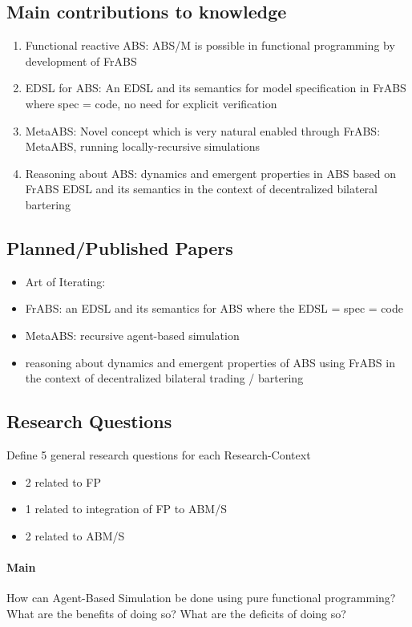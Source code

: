 \subsection{Main contributions to knowledge}
\begin{enumerate}
	\item Functional reactive ABS: ABS/M is possible in functional programming by development of FrABS
	\item EDSL for ABS: An EDSL and its semantics for model specification in FrABS where spec = code, no need for explicit verification
	\item MetaABS: Novel concept which is very natural enabled through FrABS: MetaABS, running locally-recursive simulations
	\item Reasoning about ABS: dynamics and emergent properties in ABS based on FrABS EDSL and its semantics in the context of decentralized bilateral bartering
\end{enumerate}


\subsection{Planned/Published Papers}
\begin{itemize}
	\item Art of Iterating: 
	\item FrABS: an EDSL and its semantics for ABS where the EDSL = spec = code
	\item MetaABS: recursive agent-based simulation
	\item reasoning about dynamics and emergent properties of ABS using FrABS in the context of decentralized bilateral trading / bartering
\end{itemize}


\subsection{Research Questions}
Define 5 general research questions for each Research-Context
	\begin{itemize}
    \item 2 related to FP
    \item 1 related to integration of FP to ABM/S
    \item 2 related to ABM/S
    \end{itemize}

\paragraph{Main} 
How can Agent-Based Simulation be done using pure functional programming?
	What are the benefits of doing so?
	What are the deficits of doing so?

